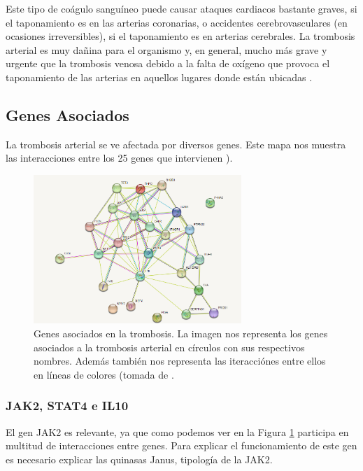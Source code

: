Este tipo de coágulo sanguíneo puede causar ataques cardiacos bastante graves, si el taponamiento es en las arterias coronarias, o accidentes cerebrovasculares (en ocasiones irreversibles), si el taponamiento es en arterias cerebrales. La trombosis arterial es muy dañina para el organismo y, en general, mucho más grave y urgente que la trombosis venosa debido a la falta de oxígeno que provoca el taponamiento de las arterias en aquellos lugares donde están ubicadas \cite{Trombosis_Bayer}. 
	
\subsection{Genes Asociados}
		La trombosis arterial se ve afectada por diversos genes. Este mapa nos muestra las interacciones entre los 25 genes que intervienen ).
		
    \begin{figure}[h]
        \centering
    	\includegraphics[width=0.70\textwidth]{figures/genes_asociados.png}
    	\caption{Genes asociados en la trombosis. La imagen nos representa los genes asociados a la trombosis arterial en círculos con sus respectivos nombres. Además también nos representa las iteracciónes entre ellos en líneas de colores (tomada de \cite{grafo}.}
    	\label{fig: Figura 2}
      \end{figure}
\subsubsection{JAK2, STAT4 e IL10}

          El gen JAK2 es relevante, ya que como podemos ver en la Figura \ref{fig: Figura 2}  participa en multitud de interacciones entre genes. Para explicar el funcionamiento de este gen es necesario explicar las quinasas Janus, tipología de la JAK2.\\
		
